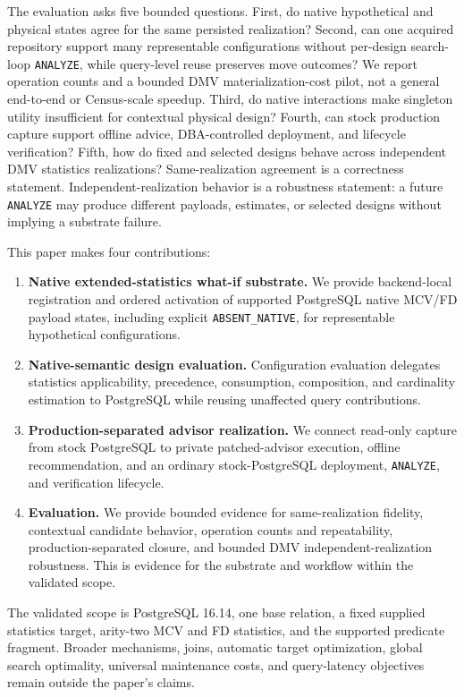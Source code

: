 The evaluation asks five bounded questions. First, do native hypothetical and
physical states agree for the same persisted realization? Second, can one
acquired repository support many representable configurations without
per-design search-loop \texttt{ANALYZE}, while query-level reuse preserves move
outcomes? We report operation counts and a bounded DMV materialization-cost
pilot, not a general end-to-end or Census-scale speedup. Third, do native
interactions make
singleton utility insufficient for contextual physical design? Fourth, can
stock production capture support offline advice, DBA-controlled deployment,
and lifecycle verification? Fifth, how do fixed and selected designs behave
across independent DMV statistics realizations? Same-realization agreement is a
correctness statement. Independent-realization behavior is a robustness
statement: a future \texttt{ANALYZE} may produce different payloads, estimates,
or selected designs without implying a substrate failure.

This paper makes four contributions:

\begin{enumerate}
\item \textbf{Native extended-statistics what-if substrate.} We provide
backend-local registration and ordered activation of supported PostgreSQL
native MCV/FD payload states, including explicit \texttt{ABSENT\_NATIVE}, for
representable hypothetical configurations.
\item \textbf{Native-semantic design evaluation.} Configuration evaluation
delegates statistics applicability, precedence, consumption, composition, and
cardinality estimation to PostgreSQL while reusing unaffected query
contributions.
\item \textbf{Production-separated advisor realization.} We connect
read-only capture from stock PostgreSQL to private patched-advisor execution,
offline recommendation, and an ordinary stock-PostgreSQL deployment,
\texttt{ANALYZE}, and verification lifecycle.
\item \textbf{Evaluation.} We provide bounded evidence for same-realization
fidelity, contextual candidate behavior, operation counts and repeatability,
production-separated closure, and bounded DMV independent-realization robustness. This is
evidence for the substrate and workflow within the validated scope.
\end{enumerate}

The validated scope is PostgreSQL 16.14, one base relation, a fixed supplied
statistics target, arity-two MCV and FD statistics, and the supported predicate
fragment. Broader mechanisms, joins, automatic target optimization, global
search optimality, universal maintenance costs, and query-latency objectives
remain outside the paper's claims.
